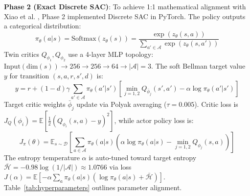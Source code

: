 \textbf{Phase 2 (Exact Discrete SAC)}: To achieve 1:1 mathematical alignment with Xiao et al. \cite{xiao2024decision}, Phase 2 implemented Discrete SAC in PyTorch. The policy outputs a categorical distribution:
\begin{equation}
    \pi_\theta(a|s) = \text{Softmax}(z_\theta(s)) = \frac{\exp(z_\theta(s, a))}{\sum_{a' \in \mathcal{A}} \exp(z_\theta(s, a'))}
\end{equation}
Twin critics $Q_{\phi_1}, Q_{\phi_2}$ use a 4-layer MLP topology: $\text{Input}(\text{dim}(s)) \rightarrow 256 \rightarrow 256 \rightarrow 64 \rightarrow |\mathcal{A}|=3$. The soft Bellman target value $y$ for transition $(s, a, r, s', d)$ is:
\begin{equation}
    y = r + (1 - d) \gamma \sum_{a' \in \mathcal{A}} \pi_\theta(a'|s') \left[ \min_{j=1,2} Q_{\bar{\phi}_j}(s', a') - \alpha \log \pi_\theta(a'|s') \right]
\end{equation}
Target critic weights $\bar{\phi}_j$ update via Polyak averaging ($\tau = 0.005$). Critic loss is $J_Q(\phi_i) = \mathbb{E}[ \frac{1}{2} ( Q_{\phi_i}(s, a) - y )^2 ]$, while actor policy loss is:
\begin{equation}
    J_\pi(\theta) = \mathbb{E}_{s \sim \mathcal{D}} \left[ \sum_{a \in \mathcal{A}} \pi_\theta(a|s) \left( \alpha \log \pi_\theta(a|s) - \min_{j=1,2} Q_{\phi_j}(s, a) \right) \right]
\end{equation}
The entropy temperature $\alpha$ is auto-tuned toward target entropy $\bar{\mathcal{H}} = -0.98 \log(1/|\mathcal{A}|) \approx 1.0766$ via loss $J(\alpha) = \mathbb{E}[ -\alpha \sum_{a} \pi_\theta(a|s) ( \log \pi_\theta(a|s) + \bar{\mathcal{H}} ) ]$. Table~\ref{tab:hyperparameters} outlines parameter alignment.

